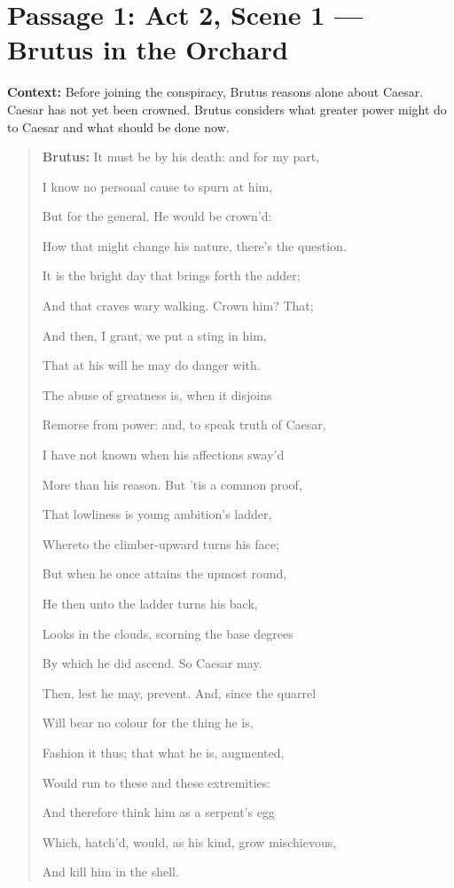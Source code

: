 \documentclass[11pt]{article}
\newenvironment{playpassage}{\begin{quote}\small\setlength{\parskip}{0.05em}\setlength{\parindent}{0pt}}{\end{quote}}
\newcommand{\speaker}[1]{\textbf{#1:}}
\begin{document}
\section*{Passage 1: Act 2, Scene 1 --- Brutus in the Orchard}
\textbf{Context:} Before joining the conspiracy, Brutus reasons alone about Caesar. Caesar has not yet been crowned. Brutus considers what greater power might do to Caesar and what should be done now.
\begin{playpassage}
\speaker{Brutus} It must be by his death: and for my part,\par
I know no personal cause to spurn at him,\par
But for the general. He would be crown'd:\par
How that might change his nature, there's the question.\par
It is the bright day that brings forth the adder;\par
And that craves wary walking. Crown him? That;\par
And then, I grant, we put a sting in him,\par
That at his will he may do danger with.\par
The abuse of greatness is, when it disjoins\par
Remorse from power: and, to speak truth of Caesar,\par
I have not known when his affections sway'd\par
More than his reason. But 'tis a common proof,\par
That lowliness is young ambition's ladder,\par
Whereto the climber-upward turns his face;\par
But when he once attains the upmost round,\par
He then unto the ladder turns his back,\par
Looks in the clouds, scorning the base degrees\par
By which he did ascend. So Caesar may.\par
Then, lest he may, prevent. And, since the quarrel\par
Will bear no colour for the thing he is,\par
Fashion it thus; that what he is, augmented,\par
Would run to these and these extremities:\par
And therefore think him as a serpent's egg\par
Which, hatch'd, would, as his kind, grow mischievous,\par
And kill him in the shell.
\end{playpassage}
\end{document}
